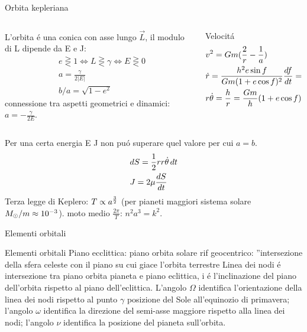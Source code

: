 \begin{wordonframe}{Orbita kepleriana}
\begin{columns}[T]
\begin{column}{0.45\textwidth}
L'orbita \'e una conica con asse lungo $\vec{L}$, il modulo di L dipende da E e J:
\begin{align*}
&e\gtreqless1\Leftrightarrow L\gtreqless\gamma\Leftrightarrow E\gtreqless0\\
&a=\frac{\gamma}{2|E|}\\
&b/a=\sqrt{1-e^2}
\end{align*}
connessione tra aspetti geometrici e dinamici: $a=-\frac{\gamma}{2E}$.
\end{column}
\begin{column}{0.55\textwidth}
\begin{block}{Velocit\'a}
\begin{align*}
&v^2=Gm(\frac{2}{r}-\frac{1}{a})\\
&\dot{r}=\frac{h^2e\sin{f}}{Gm(1+e\cos{f})^2}\TDy{t}{f}=\frac{Gm}{h}e\sin{f}\\
&r\dot{\theta}=\frac{h}{r}=\frac{Gm}{h}(1+e\cos{f})
\end{align*}
\end{block}
\end{column}
\end{columns}
Per una certa energia E J non pu\'o superare quel valore per cui $a=b$.
\begin{align*}
&dS=\frac{1}{2}rr\dot{\theta}\,dt\\
&J=2\mu\TDy{t}{S}
\end{align*}
Terza legge di Keplero: $T\propto a\expy{\frac{3}{2}}$ (per pianeti maggiori sistema solare $\msun{}/m\approx\num{e-3}$).
moto medio $\frac{2\pi}{T}$: $n^2a^3=k^2$.
\end{wordonframe}

\begin{frame}{Elementi orbitali}

\end{frame}

\begin{wordonframe}{Elementi orbitali}
Piano ecclittica: piano orbita solare rif geocentrico: ''intersezione della sfera celeste con il piano su cui giace l'orbita terrestre
Linea dei nodi \'e intersezione tra piano orbita pianeta e piano eclittica, i \'e l'inclinazione del piano dell'orbita rispetto al piano dell'eclittica.
L'angolo $\Omega$ identifica l'orientazione della linea dei nodi rispetto al punto $\gamma$ posizione del Sole all'equinozio di primavera; l'angolo $\omega$ identifica la direzione del semi-asse maggiore rispetto alla linea dei nodi; l'angolo $\nu$ identifica la posizione del pianeta sull'orbita.
\end{wordonframe}

